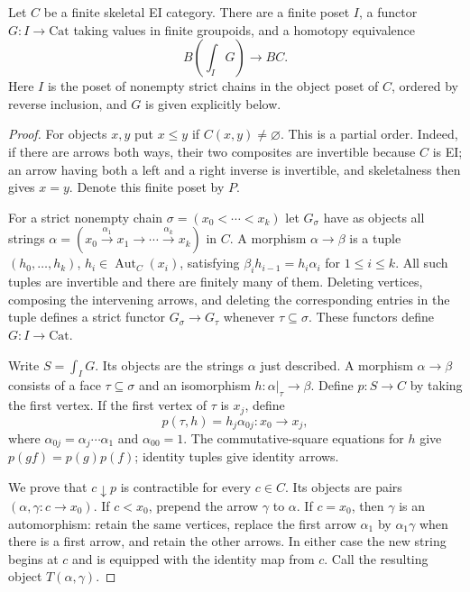 \begin{lemma}
\label{D:EI-decomposition}
Let $C$ be a finite skeletal EI category.  There are a finite poset $I$,
a functor $G:I\to\mathrm{Cat}$ taking values in finite groupoids, and
a homotopy equivalence
\[
 B\left(\int_I G\right)\longrightarrow BC.
\]
Here $I$ is the poset of nonempty strict chains in the object poset of
$C$, ordered by reverse inclusion, and $G$ is given explicitly below.
\end{lemma}
\begin{proof}
For objects $x,y$ put $x\leq y$ if $C(x,y)\ne\varnothing$.
This is a partial order.  Indeed, if there are arrows both ways, their
two composites are invertible because $C$ is EI; an arrow having both
a left and a right inverse is invertible, and skeletalness then gives
$x=y$.  Denote this finite poset by $P$.

For a strict nonempty chain $\sigma=(x_0<\cdots<x_k)$ let $G_\sigma$
have as objects all strings
$\alpha=(x_0\xrightarrow{\alpha_1}x_1\to\cdots
\xrightarrow{\alpha_k}x_k)$ in $C$.  A morphism
$\alpha\to\beta$ is a tuple
$(h_0,\ldots,h_k)$, $h_i\in\operatorname{Aut}_C(x_i)$, satisfying
$\beta_i h_{i-1}=h_i\alpha_i$ for $1\leq i\leq k$.
All such tuples are invertible and there are finitely many of them.
Deleting vertices, composing the intervening arrows, and deleting
the corresponding entries in the tuple defines a strict functor
$G_\sigma\to G_\tau$ whenever $\tau\subseteq\sigma$.
These functors define $G:I\to\mathrm{Cat}$.

Write $S=\int_I G$.  Its objects are the strings $\alpha$ just
described.  A morphism $\alpha\to\beta$ consists of a face
$\tau\subseteq\sigma$ and an isomorphism
$h:\alpha|_\tau\to\beta$.  Define $p:S\to C$ by taking the first
vertex.  If the first vertex of $\tau$ is $x_j$, define
\[
 p(\tau,h)=h_j\alpha_{0j}:x_0\longrightarrow x_j,
\]
where $\alpha_{0j}=\alpha_j\cdots\alpha_1$ and
$\alpha_{00}=1$.  The commutative-square equations for $h$ give
$p(gf)=p(g)p(f)$; identity tuples give identity arrows.

We prove that $c\downarrow p$ is contractible for every $c\in C$.
Its objects are pairs $(\alpha,\gamma:c\to x_0)$.
If $c<x_0$, prepend the arrow $\gamma$ to $\alpha$.
If $c=x_0$, then $\gamma$ is an automorphism: retain the same
vertices, replace the first arrow $\alpha_1$ by
$\alpha_1\gamma$ when there is a first arrow, and retain the other
arrows.  In either case the new string begins at $c$ and is equipped
with the identity map from $c$.  Call the resulting object $T(\alpha,\gamma)$.


\end{proof}
